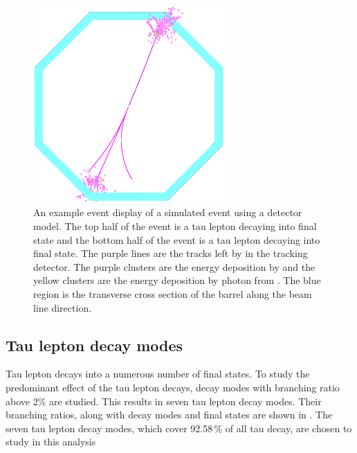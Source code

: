 \begin{figure}[tbph]
\centering
\includegraphics[width=0.65\textwidth]{tau/tau_evt_dsp2}
\caption{ An example event display of a simulated \eeToTauTau event using a \ILD detector model. The top half of the event is a tau lepton decaying into \decayRhoFinalStateShort final state and the bottom half of the event is a tau lepton decaying into  \decayThreePionPhotonShort final state. The purple lines are the tracks left by \Ppipm in the tracking detector. The purple clusters are the energy deposition by \Ppipm and the yellow clusters are the energy deposition by photon from \HepProcess{\Ppizero \to \Pphoton \Pphoton}. The blue region is the transverse cross section of the \ECAL barrel along the beam line direction.}
\label{fig:tauEvtDsp}
\end{figure}

\subsection{Tau lepton decay modes}

Tau lepton decays into a numerous number of final states. To study the predominant effect of the tau lepton decays, decay modes with branching ratio above 2\% are studied. This results in seven tau lepton decay modes. Their branching ratios, along with decay modes and final states are  shown in . The seven tau lepton decay modes, which cover 92.58\,\% of all tau decay, are chosen to study in this analysis


